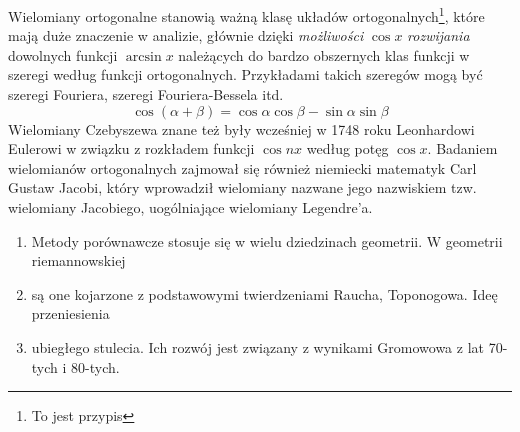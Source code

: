 \documentclass[a4paper]{article}
\begin{document}
Wielomiany ortogonalne stanowią ważną klasę układów ortogonalnych\footnote{To jest przypis}, które mają duże znaczenie w analizie, głównie dzięki
{\slshape możliwości} $\cos x$ \textsl{rozwijania} dowolnych funkcji $\arcsin x$ należących do bardzo obszernych klas funkcji w szeregi według funkcji ortogonalnych.
Przykładami takich szeregów mogą być szeregi Fouriera, szeregi Fouriera-Bessela itd.
\[
\cos (\alpha + \beta) = \cos \alpha \cos\beta - \sin \alpha \sin \beta
\]
Wielomiany Czebyszewa znane też były wcześniej w 1748 roku Leonhardowi Eulerowi w związku z rozkładem funkcji 
$\cos nx$ według potęg $\cos x$. Badaniem wielomianów ortogonalnych zajmował się również niemiecki matematyk Carl Gustaw 
Jacobi, który wprowadził wielomiany nazwane jego nazwiskiem tzw. wielomiany Jacobiego, uogólniające wielomiany Legendre'a.

\begin{enumerate}
\item Metody porównawcze stosuje się w wielu dziedzinach geometrii. W geometrii riemannowskiej
\item są one kojarzone z podstawowymi twierdzeniami Raucha, Toponogowa. Ideę przeniesienia 
\item ubiegłego stulecia. Ich rozwój jest związany z wynikami Gromowowa z lat 70-tych i 80-tych.
\end{enumerate}
\end{document}
